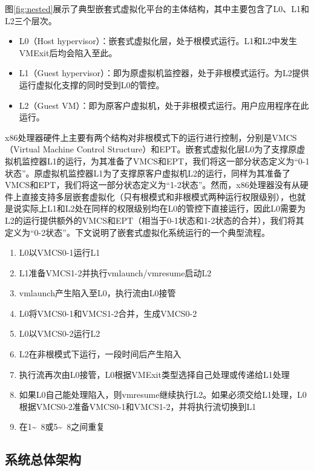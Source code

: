 图\ref{fig:nested}展示了典型嵌套式虚拟化平台的主体结构，其中主要包含了L0、L1和L2三个层次。

\begin{itemize}
\item{L0（Host hypervisor）：嵌套式虚拟化层，处于根模式运行。L1和L2中发生VMExit后均会陷入至此。}
\item{L1（Guest hypervisor）：即为原虚拟机监控器，处于非根模式运行。为L2提供运行虚拟化支撑的同时受到L0的管控。}
\item{L2（Guest VM）：即为原客户虚拟机，处于非根模式运行。用户应用程序在此运行。}
\end{itemize}

x86处理器硬件上主要有两个结构对非根模式下的运行进行控制，分别是VMCS（Virtual Machine Control Structure）和EPT。嵌套式虚拟化层L0为了支撑原虚拟机监控器L1的运行，为其准备了VMCS和EPT，我们将这一部分状态定义为“0-1状态”。原虚拟机监控器L1为了支撑原客户虚拟机L2的运行，同样为其准备了VMCS和EPT，我们将这一部分状态定义为“1-2状态”。然而，x86处理器没有从硬件上直接支持多层嵌套虚拟化（只有根模式和非根模式两种运行权限级别），也就是说实际上L1和L2处在同样的权限级别均在L0的管控下直接运行，因此L0需要为L2的运行提供额外的VMCS和EPT（相当于0-1状态和1-2状态的合并），我们将其定义为“0-2状态”。下文说明了嵌套式虚拟化系统运行的一个典型流程。

\begin{enumerate}
\item L0以VMCS0-1运行L1
\item L1准备VMCS1-2并执行vmlaunch/vmresume启动L2
\item vmlaunch产生陷入至L0，执行流由L0接管
\item L0将VMCS0-1和VMCS1-2合并，生成VMCS0-2
\item L0以VMCS0-2运行L2
\item L2在非根模式下运行，一段时间后产生陷入
\item 执行流再次由L0接管，L0根据VMExit类型选择自己处理或传递给L1处理
\item 如果L0自己能处理陷入，则vmresume继续执行L2。如果必须交给L1处理，L0根据VMCS0-2准备VMCS0-1和VMCS1-2，并将执行流切换到L1
\item 在1\~~8或5\~~8之间重复
\end{enumerate}

\subsection{系统总体架构}





